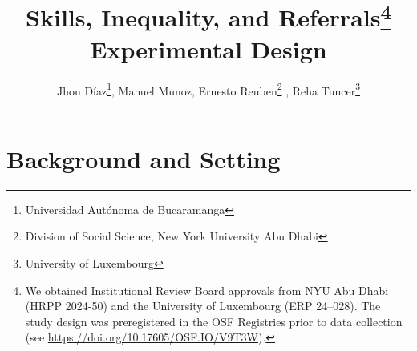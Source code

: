 \documentclass[11pt,a4paper,oneside]{article}
\title{Skills, Inequality, and Referrals\footnote{We obtained Institutional Review Board approvals from NYU Abu Dhabi (HRPP 2024-50) and the University of Luxembourg (ERP 24–028). The study design was preregistered in the OSF Registries prior to data collection (see \url{https://doi.org/10.17605/OSF.IO/V9T3W}).} \\ \large Experimental Design \\}
\author{Jhon Díaz\footnote{Universidad Autónoma de Bucaramanga}, Manuel Munoz\footremember{liser}{Luxembourg Institute of Socio-Economic Research}, Ernesto Reuben\footnote{Division of Social Science, New York University Abu Dhabi} \footrecall{liser}, Reha Tuncer\footnote{University of Luxembourg}}
\begin{document}
\maketitle




\section{Background and Setting}
\end{document}
